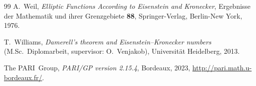 \documentclass[10pt]{article}
\theoremstyle{definition}
\begin{document}
\begin{thebibliography}{99}
A.~Weil,
\textit{Elliptic Functions According to Eisenstein and Kronecker},
Ergebnisse der Mathematik und ihrer Grenzgebiete \textbf{88},
Springer-Verlag, Berlin-New York, 1976.

T.~Williams,
\emph{Damerell's theorem and Eisenstein--Kronecker numbers}
(M.Sc.\ Diplomarbeit, supervisor: O.~Venjakob),
Universit\"at Heidelberg, 2013.

The PARI~Group,
\textit{{PARI/GP} version 2.15.4},
Bordeaux, 2023,
\url{http://pari.math.u-bordeaux.fr/}.

\end{thebibliography}
\end{document}

